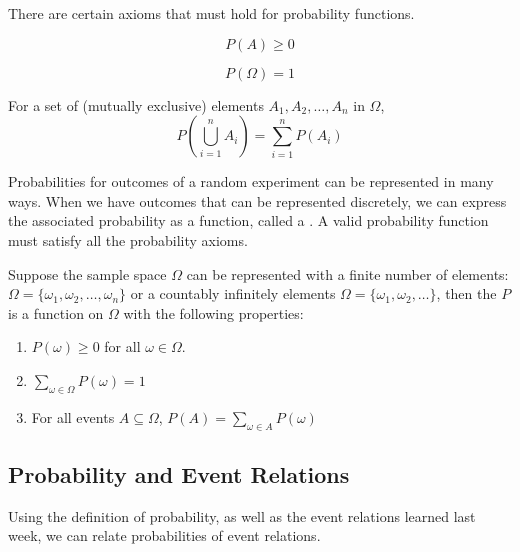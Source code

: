 There are certain axioms that must hold for probability functions. 

\begin{axiom}[Axiom 1]
    $$P(A) \ge 0$$
\end{axiom}

\begin{axiom}[Axiom 2]
    $$P(\Omega) = 1$$
\end{axiom}

\begin{axiom}[Axiom 3]
    For a set of  (mutually exclusive) elements $A_1, A_2, \dots, A_n$ in $\Omega$, 
    $$P \left( \bigcup_{i=1}^n A_i \right) = \sum_{i=1}^n P(A_i)$$
\end{axiom}

Probabilities for outcomes of a random experiment can be represented in many ways. When we have outcomes that can be represented discretely, we can express the associated probability as a function, called a . A valid probability function must satisfy all the probability axioms.

\begin{definition}
    Suppose the sample space $\Omega$ can be represented with a finite number of elements: $\Omega = \{ \omega_1, \omega_2, \dots, \omega_n \}$ or a countably infinitely elements $\Omega = \{ \omega_1, \omega_2, \dots \}$, then the  $P$ is a function on $\Omega$ with the following properties:

    \begin{enumerate}
        \item $P(\omega) \ge 0$ for all $\omega \in \Omega$. 
        \item $\sum_{\omega \in \Omega} P(\omega) = 1$
        \item For all events $A \subseteq \Omega$, $P(A) = \sum_{\omega \in A} P(\omega)$
    \end{enumerate}
\end{definition}

\subsection{Probability and Event Relations}

Using the definition of probability, as well as the event relations learned last week, we can relate probabilities of event relations.


